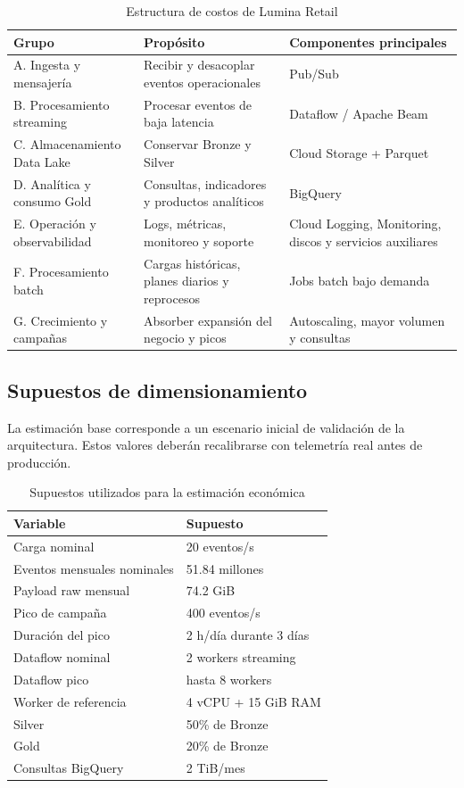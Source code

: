 \documentclass[11pt,a4paper]{article}
\begin{document}
\begin{table}[H]
\caption{Estructura de costos de Lumina Retail}\label{tab:estructura-costos}
\small
\begin{tabularx}{\linewidth}{@{}P{.27\linewidth}P{.36\linewidth}Y@{}}\toprule
Grupo & Propósito & Componentes principales\\\midrule
A. Ingesta y mensajería & Recibir y desacoplar eventos operacionales & Pub/Sub\\
B. Procesamiento streaming & Procesar eventos de baja latencia & Dataflow / Apache Beam\\
C. Almacenamiento Data Lake & Conservar Bronze y Silver & Cloud Storage + Parquet\\
D. Analítica y consumo Gold & Consultas, indicadores y productos analíticos & BigQuery\\
E. Operación y observabilidad & Logs, métricas, monitoreo y soporte & Cloud Logging, Monitoring, discos y servicios auxiliares\\
F. Procesamiento batch & Cargas históricas, planes diarios y reprocesos & Jobs batch bajo demanda\\
G. Crecimiento y campañas & Absorber expansión del negocio y picos & Autoscaling, mayor volumen y consultas\\\bottomrule
\end{tabularx}
\end{table}

\subsection{Supuestos de dimensionamiento}
La estimación base corresponde a un escenario inicial de validación de la arquitectura. Estos valores deberán recalibrarse con telemetría real antes de producción.

\begin{table}[H]
\caption{Supuestos utilizados para la estimación económica}\label{tab:supuestos-costos}
\small
\begin{tabularx}{\linewidth}{@{}P{.48\linewidth}Y@{}}\toprule
Variable & Supuesto\\\midrule
Carga nominal & 20 eventos/s\\
Eventos mensuales nominales & 51.84 millones\\
Payload raw mensual & 74.2 GiB\\
Pico de campaña & 400 eventos/s\\
Duración del pico & 2 h/día durante 3 días\\
Dataflow nominal & 2 workers streaming\\
Dataflow pico & hasta 8 workers\\
Worker de referencia & 4 vCPU + 15 GiB RAM\\
Silver & 50\% de Bronze\\
Gold & 20\% de Bronze\\
Consultas BigQuery & 2 TiB/mes\\\bottomrule
\end{tabularx}
\end{table}
\end{document}
